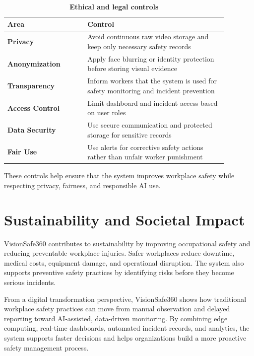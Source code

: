 \begin{table}[H]
\centering
\renewcommand{\arraystretch}{1.55}
\begin{tabular}{|>{\centering\arraybackslash}p{0.32\linewidth}|>{\centering\arraybackslash}p{0.56\linewidth}|}
\hline
\textbf{Area} & \textbf{Control} \\
\hline
\textbf{Privacy} & Avoid continuous raw video storage and keep only necessary safety records \\
\hline
\textbf{Anonymization} & Apply face blurring or identity protection before storing visual evidence \\
\hline
\textbf{Transparency} & Inform workers that the system is used for safety monitoring and incident prevention \\
\hline
\textbf{Access Control} & Limit dashboard and incident access based on user roles \\
\hline
\textbf{Data Security} & Use secure communication and protected storage for sensitive records \\
\hline
\textbf{Fair Use} & Use alerts for corrective safety actions rather than unfair worker punishment \\
\hline
\end{tabular}
\caption{\textbf{Ethical and legal controls}}
\label{tab:chapter7-ethics}
\end{table}

These controls help ensure that the system improves workplace safety while respecting privacy, fairness, and responsible AI use.

\section{Sustainability and Societal Impact}

VisionSafe360 contributes to sustainability by improving occupational safety and reducing preventable workplace injuries. Safer workplaces reduce downtime, medical costs, equipment damage, and operational disruption. The system also supports preventive safety practices by identifying risks before they become serious incidents.

From a digital transformation perspective, VisionSafe360 shows how traditional workplace safety practices can move from manual observation and delayed reporting toward AI-assisted, data-driven monitoring. By combining edge computing, real-time dashboards, automated incident records, and analytics, the system supports faster decisions and helps organizations build a more proactive safety management process.

